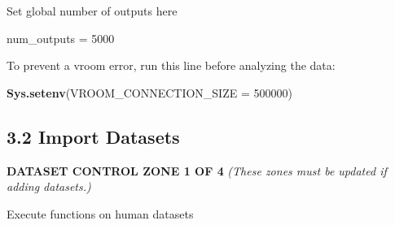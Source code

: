 \documentclass[
]{article}
\newenvironment{Shaded}{\begin{snugshade}}{\end{snugshade}}
\newcommand{\ControlFlowTok}[1]{\textcolor[rgb]{0.13,0.29,0.53}{\textbf{#1}}}
\newcommand{\DataTypeTok}[1]{\textcolor[rgb]{0.13,0.29,0.53}{#1}}
\newcommand{\DecValTok}[1]{\textcolor[rgb]{0.00,0.00,0.81}{#1}}
\newcommand{\FloatTok}[1]{\textcolor[rgb]{0.00,0.00,0.81}{#1}}
\newcommand{\KeywordTok}[1]{\textcolor[rgb]{0.13,0.29,0.53}{\textbf{#1}}}
\newcommand{\NormalTok}[1]{#1}
\newcommand{\OperatorTok}[1]{\textcolor[rgb]{0.81,0.36,0.00}{\textbf{#1}}}
\newcommand{\StringTok}[1]{\textcolor[rgb]{0.31,0.60,0.02}{#1}}
\begin{document}
\begin{Shaded}
\end{Shaded}

Set global number of outputs here

\begin{Shaded}
\begin{Highlighting}[]
\NormalTok{num_outputs =}\StringTok{ }\DecValTok{5000}
\end{Highlighting}
\end{Shaded}

To prevent a vroom error, run this line before analyzing the data:

\begin{Shaded}
\begin{Highlighting}[]
\KeywordTok{Sys.setenv}\NormalTok{(}\DataTypeTok{VROOM_CONNECTION_SIZE =} \DecValTok{500000}\NormalTok{)}
\end{Highlighting}
\end{Shaded}

\hypertarget{import-datasets}{%
\subsection{3.2 Import Datasets}\label{import-datasets}}

\textbf{DATASET CONTROL ZONE 1 OF 4} \emph{(These zones must be updated
if adding datasets.)}

Execute functions on human datasets
\end{document}
